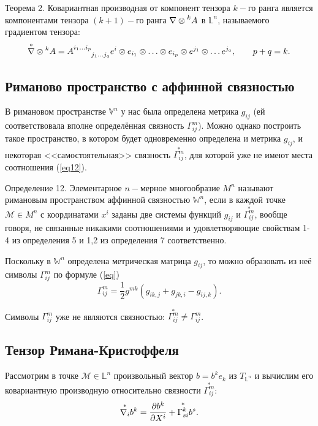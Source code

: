 \documentclass[14pt,a4paper]{extarticle}
\begin{document}
Теорема 2. Ковариантная производная от компонент тензора $k-$го ранга является компонентами тензора $(k+1)-$го ранга $\nabla \otimes \prescript{k}{}{A}$ в $\mathbb{L}^n$, называемого градиентом тензора:
\begin{equation}\label{eq26}
	\overset{*}{\nabla} \otimes \prescript{k}{}{A} = A\indices{^{i_1 \ldots i_p}_{j_1 \ldots j_q}} e^i \otimes e_{i_1} \otimes \ldots \otimes e_{i_p} \otimes e^{j_1} \otimes \ldots e^{j_q}, \qquad p+q=k.
\end{equation}

\subsection{Риманово пространство с аффинной связностью}
В римановом пространстве $\mathbb{V}^n$ у нас была определена метрика $g_{ij}$ (ей соответствовала вполне определённая связность $\Gamma_{ij}^m$). Можно однако построить такое пространство, в котором будет одновременно определена и метрика $g_{ij}$, и некоторая <<самостоятельная>> связность  $\overset{*}{\Gamma_{ij}^m}$, для которой уже не имеют места соотношения (\ref{eq12}).

Определение 12. Элементарное $n-$мерное многообразие $M^n$ называют римановым пространством аффинной связностью $\mathbb{W}^n$, если в каждой точке $\mathcal{M} \in M^n$ с координатами $x^i$ заданы две системы функций $g_{ij}$ и $\overset{*}{\Gamma_{ij}^m}$, вообще говоря, не связанные никакими соотношениями и удовлетворяющие свойствам 1-4 из определения 5 и 1,2 из определения 7 соответственно.

Поскольку в $\mathbb{W}^n$ определена метрическая матрица $g_{ij}$, то можно образовать из неё символы $\Gamma_{ij}^m$ по формуле (\ref{eq})
\begin{equation}\label{eq25}
 \Gamma_{ij}^m = \frac{1}{2}g^{mk}(g_{ik,j} + g_{jk,i} - g_{ij,k}).
\end{equation}

Символы $\Gamma_{ij}^m$ уже не являются связностью: $\overset{*}{\Gamma_{ij}^m} \neq  \Gamma_{ij}^m$.


\subsection{Тензор Римана-Кристоффеля}
Рассмотрим в точке $\mathcal{M} \in \mathbb{L}^n$ произвольный вектор $b = b^ke_k$ из $T_{\mathbb{L}^n}$ и вычислим его ковариантную производную относительно связности $\overset{*}{\Gamma_{ij}^m}$:
\begin{equation} \label{eq 28}
	\overset{*}{\nabla_i}b^k = \pdv{b^k}{X^i} + \overset{*}{\Gamma_{si}^k}b^s.
\end{equation}
\end{document}
